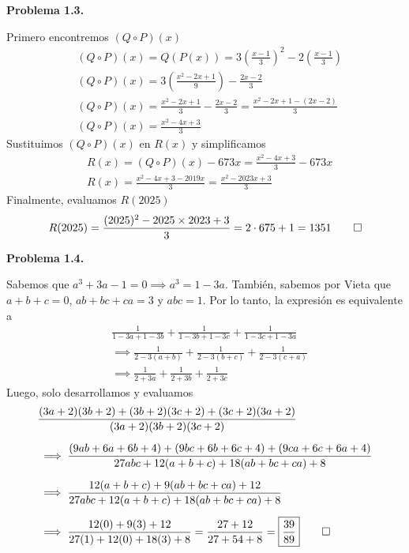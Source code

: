 \textbf{Problema 1.3.}
\begin{solution}
    Primero encontremos $(Q \circ P)(x)$
    \begin{align*}
    &(Q \circ P)(x) = Q(P(x)) = 3\left( \frac{x - 1}{3} \right)^2 - 2\left( \frac{x - 1}{3} \right)\\
    &(Q \circ P)(x) = 3\left( \frac{x^2 - 2x + 1}{9} \right) - \frac{2x - 2}{3}\\
    &(Q \circ P)(x) = \frac{x^2 - 2x + 1}{3} - \frac{2x - 2}{3} = \frac{x^2 - 2x + 1 - (2x - 2)}{3}\\
    &(Q \circ P)(x) = \frac{x^2 - 4x + 3}{3}
    \end{align*}
    Sustituimos $(Q \circ P)(x)$ en $R(x)$ y simplificamos
    \begin{align*}
        &R(x) = (Q \circ P)(x) - 673x = \frac{x^2 - 4x + 3}{3} - 673x\\
        &R(x) = \frac{x^2 - 4x + 3 - 2019x}{3} = \frac{x^2 - 2023x + 3}{3}
    \end{align*}
    Finalmente, evaluamos $R(2025)$
    \[
        R(2025) = \frac{(2025)^2 - 2025\times 2023 + 3}{3} = 2\cdot 675 + 1 = 1351 \qedhere
    \]
\end{solution}

\textbf{Problema 1.4.}
\begin{solution}
    Sabemos que $a^3 + 3a - 1 = 0 \implies a^3 = 1 - 3a$.
    También, sabemos por Vieta que $a + b + c = 0$, $ab + bc + ca = 3$ y $abc = 1$.
    Por lo tanto, la expresión es equivalente a
    \begin{align*}
        &\frac{1}{1 - 3a + 1 - 3b} + \frac{1}{1 - 3b + 1 - 3c} + \frac{1}{1 - 3c + 1 - 3a}\\[2mm]
        &\implies \frac{1}{2 - 3(a + b)} + \frac{1}{2 - 3(b + c)} + \frac{1}{2 - 3(c + a)}\\[2mm]
        &\implies \frac{1}{2 + 3a} + \frac{1}{2 + 3b} + \frac{1}{2 + 3c}
    \end{align*}
    Luego, solo desarrollamos y evaluamos
    \begin{align*}
        &\frac{(3a + 2)(3b + 2) + (3b + 2)(3c + 2) + (3c + 2)(3a + 2)}{(3a + 2)(3b + 2)(3c + 2)}\\[2mm]
        &\implies \frac{(9ab + 6a + 6b + 4) + (9bc + 6b + 6c + 4) + (9ca + 6c + 6a + 4)}{27abc + 12(a + b + c) + 18(ab + bc + ca) + 8}\\[2mm]
        &\implies \frac{ 12(a + b + c) + 9(ab + bc + ca) + 12}{27abc + 12(a + b + c) + 18(ab + bc + ca) + 8}\\[2mm]
        &\implies \frac{ 12(0) + 9(3) + 12}{27(1) + 12(0) + 18(3) + 8} = \frac{27 + 12}{27 + 54 + 8}  = \boxed{\frac{39}{89}}\qedhere
    \end{align*}

\end{solution}